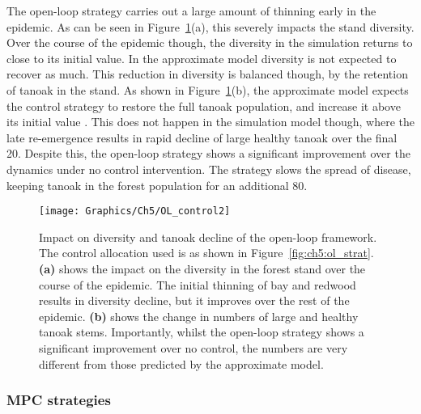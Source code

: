 The open-loop strategy carries out a large amount of thinning early in the epidemic. As can be seen in Figure~\ref{fig:ch5:ol_div_tan}(a), this severely impacts the stand diversity. Over the course of the epidemic though, the diversity in the simulation returns to close to its initial value. In the approximate model diversity is not expected to recover as much. This reduction in diversity is balanced though, by the retention of tanoak in the stand. As shown in Figure~\ref{fig:ch5:ol_div_tan}(b), the approximate model expects the control strategy to restore the full tanoak population, and increase it above its initial value . This does not happen in the simulation model though, where the late re-emergence results in rapid decline of large healthy tanoak over the final \SI{20}{\years}. Despite this, the open-loop strategy shows a significant improvement over the dynamics under no control intervention. The strategy slows the spread of disease, keeping tanoak in the forest population for an additional \SI{80}{\years}.

\begin{figure}[t]
    \begin{center}
        \texttt{[image: Graphics/Ch5/OL\_control2]}
        \caption[Open-loop strategy diversity and tanoak decline]{Impact on diversity and tanoak decline of the open-loop framework. The control allocation used is as shown in Figure~\ref{fig:ch5:ol_strat}. \textbf{(a)} shows the impact on the diversity in the forest stand over the course of the epidemic. The initial thinning of bay and redwood results in diversity decline, but it improves over the rest of the epidemic. \textbf{(b)} shows the change in numbers of large and healthy tanoak stems. Importantly, whilst the open-loop strategy shows a significant improvement over no control, the numbers are very different from those predicted by the approximate model. \label{fig:ch5:ol_div_tan}}
    \end{center}
\end{figure}

\subsubsection{MPC strategies}

